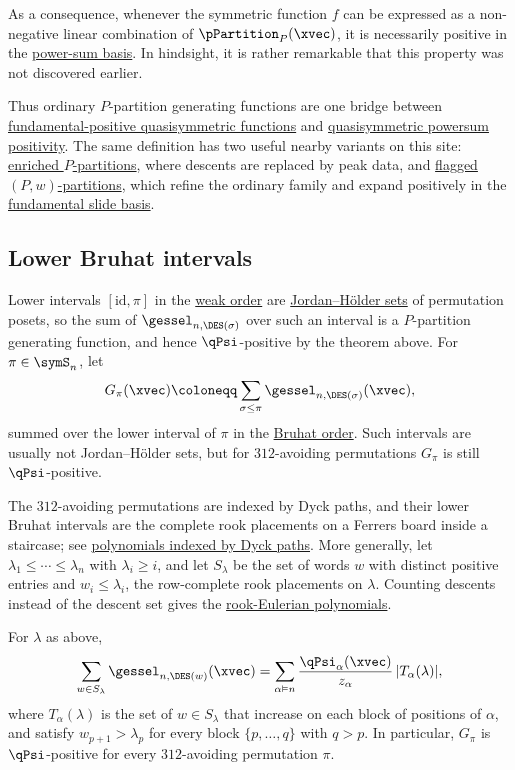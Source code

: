 As a consequence, whenever the symmetric function $f$ can be expressed as 
a non-negative linear combination of $\pPartition_P(\xvec)$,
it is necessarily positive in the \hyperref[powerSum]{power-sum basis}.
In hindsight, it is rather remarkable that this property was not discovered
earlier.

Thus ordinary $P$-partition generating functions are one bridge between
\hyperref[gessel]{fundamental-positive quasisymmetric functions} and
\hyperref[qPsi]{quasisymmetric powersum positivity}.  The same definition has
two useful nearby variants on this site: \hyperref[enrichedPPartitions]{enriched
$P$-partitions}, where descents are replaced by peak data, and
\hyperref[pPartitionsFlagged]{flagged $(P,w)$-partitions}, which refine the
ordinary family and expand positively in the \hyperref[slideF]{fundamental
slide basis}.


\subsection[pPartitionBruhatIntervals]{Lower Bruhat intervals}

Lower intervals $[\mathrm{id},\pi]$ in the \hyperref[weakOrder]{weak order} are
\hyperref[jordanHolderSet]{Jordan--Hölder sets} of permutation posets, so the
sum of $\gessel_{n,\DES(\sigma)}$ over such an interval is a $P$-partition
generating function, and hence $\qPsi$-positive by the theorem above.  For
$\pi\in\symS_n$, let
\[
  G_\pi(\xvec)\coloneqq\sum_{\sigma\leq\pi}\gessel_{n,\DES(\sigma)}(\xvec),
\]
summed over the lower interval of $\pi$ in the \hyperref[bruhatOrder]{Bruhat
order}.  Such intervals are usually not Jordan--Hölder sets, but for
$312$-avoiding permutations $G_\pi$ is still $\qPsi$-positive.

The $312$-avoiding permutations are indexed by Dyck paths, and their lower
Bruhat intervals are the complete rook placements on a Ferrers board inside a
staircase; see \hyperref[dyckPathBruhatPolynomials]{polynomials indexed by Dyck
paths}.  More generally, let $\lambda_1\leq\dotsb\leq\lambda_n$ with
$\lambda_i\geq i$, and let $S_\lambda$ be the set of words $w$ with distinct
positive entries and $w_i\leq\lambda_i$, the row-complete rook placements on
$\lambda$.  Counting descents instead of the descent set gives the
\hyperref[dyckPathRookEulerian]{rook-Eulerian polynomials}.

\begin{proposition}\label{bruhatIntervalPsiPositive}
For $\lambda$ as above,
\[
  \sum_{w\in S_\lambda}\gessel_{n,\DES(w)}(\xvec)
  =\sum_{\alpha\vDash n}\frac{\qPsi_\alpha(\xvec)}{z_\alpha}\,|T_\alpha(\lambda)|,
\]
where $T_\alpha(\lambda)$ is the set of $w\in S_\lambda$ that increase on each
block of positions of $\alpha$, and satisfy $w_{p+1}>\lambda_p$ for every block
$\{p,\dotsc,q\}$ with $q>p$.  In particular, $G_\pi$ is $\qPsi$-positive for
every $312$-avoiding permutation $\pi$.
\end{proposition}

